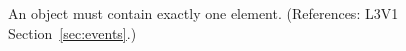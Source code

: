 An \EventAssignment object must contain exactly one  element.
(References: L3V1 Section~\ref{sec:events}.)
